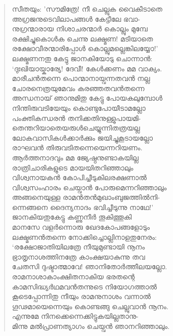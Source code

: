 \begin{verse}
സീതയും: ’സൗമിത്രേ! നീ ചെല്ലുക വൈകീടാതെ\\
അഗ്രജനുടെവിലാപങ്ങള്‍ കേട്ടീലേ ഭവാ-\\
നുഗ്രന്മാരായ നിശാചരന്മാര്‍ കൊല്ലും മുമ്പേ\\
രക്ഷിച്ചുകൊള്‍ക ചെന്നു ലക്ഷ്മണ! മടിയാതെ\\
രക്ഷോവീരന്മാരിപ്പോള്‍ കൊല്ലുമല്ലെങ്കിലയ്യോ!’\\
ലക്ഷ്മണനതു കേട്ടു ജാനകിയോടു ചൊന്നാന്‍:\\
‘ദുഃഖിയായ്കാര്യേ! ദേവീ! കേള്‍ക്കണം മമ വാക്യം.\\
മാരീചന്‍തന്നെ പൊന്മാനായ്വന്നതവന്‍ നല്ല\\
ചോരനെത്രയുമേവം കരഞ്ഞതവന്‍തന്നെ\\
അന്ധനായ് ഞാനുമിതു കേട്ടു പോയകലുമ്പോള്‍\\
നിന്തിരുവടിയേയും കൊണ്ടുപോയീടാമല്ലോ\\
പംക്തികന്ധരന്‍ തനിക്കതിനുള്ളുപായമി-\\
തെന്തറിയാതെയരുള്‍ചെയ്യുന്നിതത്രയല്ല\\
ലോകവാസികള്‍ക്കാര്‍ക്കും ജയിച്ചുകൂടായല്ലോ\\
രാഘവന്‍ തിരുവടിതന്നെയെന്നറിയണം.\\
ആര്‍ത്തനാദവും മമ ജ്യേഷ്ഠനുണ്ടാകയില്ല\\
രാത്രിചാരികളുടെ മായയിതറിഞ്ഞാലും\\
വിശ്വനായകന്‍ കോപിച്ചീടുകിലരക്ഷണാല്‍\\
വിശ്വസംഹാരം ചെയ്വാന്‍ പോരുമെന്നറിഞ്ഞാലും\\
അങ്ങനെയുള്ള രാമന്‍തന്‍മുഖാംബുജത്തില്‍നി-\\
ന്നെങ്ങനെ ദൈന്യനാദം ഭവിച്ചീടുന്നു നാഥേ!’\\
ജാനകിയതുകേട്ടു കണ്ണുനീര്‍ തൂകിത്തൂകി\\
മാനസേ വളര്‍ന്നൊരു ഖേദകോപങ്ങളോടും\\
ലക്ഷ്മണന്‍തന്നെ നോക്കിച്ചൊല്ലിനാളതുനേരം:\\
‘രക്ഷോജാതിയിലത്രേ നീയുമുണ്ടായി നൂനം\\
ഭ്രാതൃനാശത്തിനത്രേ കാംക്ഷയാകുന്നു തവ\\
ചേതസി ദുഷ്ടാത്മാവേ! ഞാനിതോര്‍ത്തീലയല്ലോ.\\
രാമനാശാകാംക്ഷിതനാകിയ ഭരതന്റെ\\
കാമസിദ്ധ്യര്‍ഥമവന്‍തന്നുടെ നിയോഗത്താല്‍\\
കൂടെപ്പോന്നിതു നീയും രാമനുനാശം വന്നാല്‍\\
ഗൂഢമായെന്നെയും കൊണ്ടങ്ങു ചെല്ലുവാന്‍ നൂനം.\\
എന്നുമേ നിനക്കെന്നെക്കിട്ടുകയില്ലതാനു-\\
മിന്നു മല്‍പ്രാണത്യാഗം ചെയ്വന്‍ ഞാനറിഞ്ഞാലും.\\

\end{verse}
